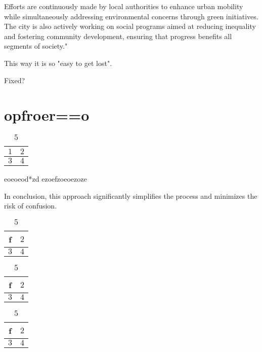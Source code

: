 \documentclass{article}
\begin{document}
Efforts are continuously made by local authorities to enhance urban mobility while simultaneously addressing environmental concerns through green initiatives. The city is also actively working on social programs aimed at reducing inequality and fostering community development, ensuring that progress benefits all segments of society."

This way it is so "easy to get lost".

Fixed?

\section{opfroer==o}

\begin{table}[h!]
    \centering
    \begin{tabular}{|c|c|}
        \hline
        $1$ & $2$ \\
        \hline
        $3$ & $4$ \\
        \hline
    \end{tabular}
    \caption{$5$}
    \label{tab:my_label}
\end{table}

eoeoeod*zd
ezoefzoeoezoze

In conclusion, this approach significantly simplifies the process and minimizes the risk of confusion.

\begin{table}[h!]
    \centering
    \begin{tabular}{|c|c|}
        \hline
        f & $2$ \\
        \hline
        $3$ & $4$ \\
        \hline
    \end{tabular}
    \caption{$5$}
    \label{tab:my_label}
\end{table}

\begin{table}[h!]
    \centering
    \begin{tabular}{|c|c|}
        \hline
        f & $2$ \\
        \hline
        $3$ & $4$ \\
        \hline
    \end{tabular}
    \caption{$5$}
    \label{tab:my_label}
\end{table}

\begin{table}[h!]
    \centering
    \begin{tabular}{|c|c|}
        \hline
        f & $2$ \\
        \hline
        $3$ & $4$ \\
        \hline
    \end{tabular}
    \caption{$5$}
    \label{tab:my_label}
\end{table}
\end{document}

